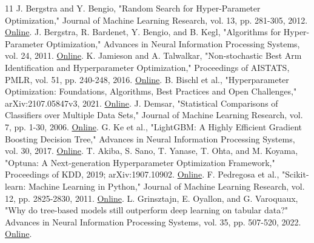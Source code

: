 \documentclass[12pt,letterpaper]{article}
\begin{document}
\begin{thebibliography}{11}
 J. Bergstra and Y. Bengio, "Random Search for Hyper-Parameter Optimization," Journal of Machine Learning Research, vol. 13, pp. 281-305, 2012. \href{https://jmlr.org/papers/v13/bergstra12a.html}{Online}.
 J. Bergstra, R. Bardenet, Y. Bengio, and B. Kegl, "Algorithms for Hyper-Parameter Optimization," Advances in Neural Information Processing Systems, vol. 24, 2011. \href{https://proceedings.neurips.cc/paper/2011/hash/86e8f7ab32cfd12577bc2619bc635690-Abstract.html}{Online}.
 K. Jamieson and A. Talwalkar, "Non-stochastic Best Arm Identification and Hyperparameter Optimization," Proceedings of AISTATS, PMLR, vol. 51, pp. 240-248, 2016. \href{https://proceedings.mlr.press/v51/jamieson16.html}{Online}.
 B. Bischl et al., "Hyperparameter Optimization: Foundations, Algorithms, Best Practices and Open Challenges," arXiv:2107.05847v3, 2021. \href{https://arxiv.org/abs/2107.05847}{Online}.
 J. Demsar, "Statistical Comparisons of Classifiers over Multiple Data Sets," Journal of Machine Learning Research, vol. 7, pp. 1-30, 2006. \href{https://jmlr.org/papers/v7/demsar06a.html}{Online}.
 G. Ke et al., "LightGBM: A Highly Efficient Gradient Boosting Decision Tree," Advances in Neural Information Processing Systems, vol. 30, 2017. \href{https://proceedings.neurips.cc/paper/2017/hash/6449f44a102fde848669bdd9eb6b76fa-Abstract.html}{Online}.
 T. Akiba, S. Sano, T. Yanase, T. Ohta, and M. Koyama, "Optuna: A Next-generation Hyperparameter Optimization Framework," Proceedings of KDD, 2019; arXiv:1907.10902. \href{https://arxiv.org/abs/1907.10902}{Online}.
 F. Pedregosa et al., "Scikit-learn: Machine Learning in Python," Journal of Machine Learning Research, vol. 12, pp. 2825-2830, 2011. \href{https://jmlr.org/papers/v12/pedregosa11a.html}{Online}.
 L. Grinsztajn, E. Oyallon, and G. Varoquaux, "Why do tree-based models still outperform deep learning on tabular data?" Advances in Neural Information Processing Systems, vol. 35, pp. 507-520, 2022. \href{https://arxiv.org/abs/2207.08815}{Online}.
\end{thebibliography}
\end{document}
